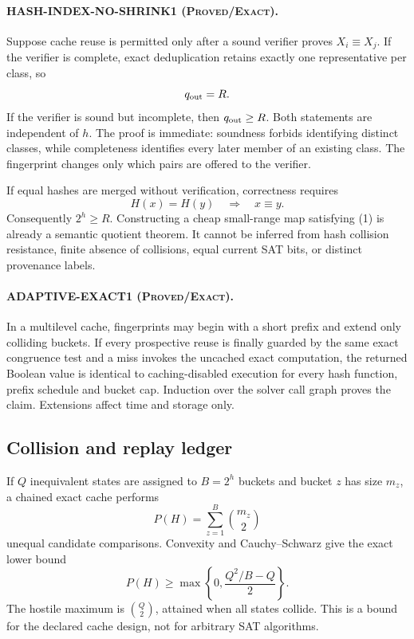 \documentclass[11pt]{article}
\newcommand{\Exact}{\textsc{Proved/Exact}}
\begin{document}
\paragraph{HASH-INDEX-NO-SHRINK1 (\Exact).}
Suppose cache reuse is permitted only after a sound verifier proves
$X_i\equiv X_j$.  If the verifier is complete, exact deduplication retains
exactly one representative per class, so
\[
             q_{\rm out}=R.
\]
If the verifier is sound but incomplete, then $q_{\rm out}\ge R$.  Both
statements are independent of $h$.  The proof is immediate: soundness forbids
identifying distinct classes, while completeness identifies every later
member of an existing class.  The fingerprint changes only which pairs are
offered to the verifier.

If equal hashes are merged without verification, correctness requires
\[
       H(x)=H(y)\quad\Longrightarrow\quad x\equiv y.       \tag{1}
\]
Consequently $2^h\ge R$.  Constructing a cheap small-range map satisfying
(1) is already a semantic quotient theorem.  It cannot be inferred from hash
collision resistance, finite absence of collisions, equal current SAT bits,
or distinct provenance labels.

\paragraph{ADAPTIVE-EXACT1 (\Exact).}
In a multilevel cache, fingerprints may begin with a short prefix and extend
only colliding buckets.  If every prospective reuse is finally guarded by the
same exact congruence test and a miss invokes the uncached exact computation,
the returned Boolean value is identical to caching-disabled execution for
every hash function, prefix schedule and bucket cap.  Induction over the
solver call graph proves the claim.  Extensions affect time and storage only.

\subsection{Collision and replay ledger}

If $Q$ inequivalent states are assigned to $B=2^h$ buckets and bucket $z$ has
size $m_z$, a chained exact cache performs
\[
       P(H)=\sum_{z=1}^{B}\binom{m_z}{2}
\]
unequal candidate comparisons.  Convexity and Cauchy--Schwarz give the exact
lower bound
\[
       P(H)\ge \max\left\{0,\frac{Q^2/B-Q}{2}\right\}.       \tag{2}
\]
The hostile maximum is $\binom Q2$, attained when all states collide.  This is
a bound for the declared cache design, not for arbitrary SAT algorithms.
\end{document}
